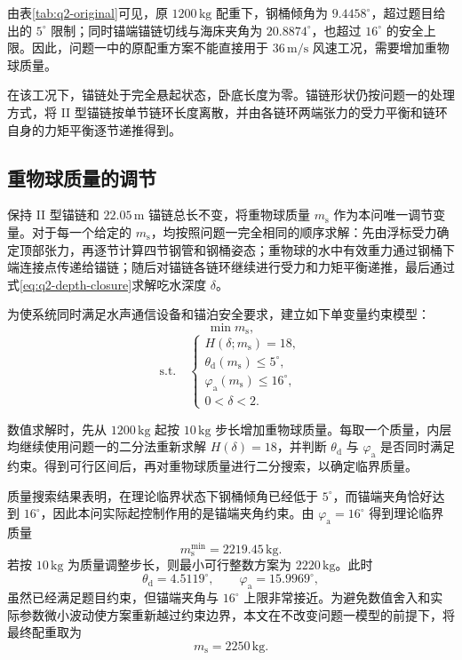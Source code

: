 由表\ref{tab:q2-original}可见，原 $1200\,\mathrm{kg}$ 配重下，钢桶倾角为 $9.4458^{\circ}$，超过题目给出的 $5^{\circ}$ 限制；同时锚端锚链切线与海床夹角为 $20.8874^{\circ}$，也超过 $16^{\circ}$ 的安全上限。因此，问题一中的原配重方案不能直接用于 $36\,\mathrm{m/s}$ 风速工况，需要增加重物球质量。

在该工况下，锚链处于完全悬起状态，卧底长度为零。锚链形状仍按问题一的处理方式，将 II 型锚链按单节链环长度离散，并由各链环两端张力的受力平衡和链环自身的力矩平衡逐节递推得到。

\subsection{重物球质量的调节}

保持 II 型锚链和 $22.05\,\mathrm{m}$ 锚链总长不变，将重物球质量 $m_{\mathrm s}$ 作为本问唯一调节变量。对于每一个给定的 $m_{\mathrm s}$，均按照问题一完全相同的顺序求解：先由浮标受力确定顶部张力，再逐节计算四节钢管和钢桶姿态；重物球的水中有效重力通过钢桶下端连接点传递给锚链；随后对锚链各链环继续进行受力和力矩平衡递推，最后通过式\eqref{eq:q2-depth-closure}求解吃水深度 $\delta$。

为使系统同时满足水声通信设备和锚泊安全要求，建立如下单变量约束模型：
\begin{equation}
  \min m_{\mathrm s},
  \label{eq:q2-objective}
\end{equation}
\begin{equation}
  \text{s.t.}\quad
  \begin{cases}
    H(\delta;m_{\mathrm s})=18,\\
    \theta_{\mathrm d}(m_{\mathrm s})\leq 5^{\circ},\\
    \varphi_{\mathrm a}(m_{\mathrm s})\leq 16^{\circ},\\
    0<\delta<2.
  \end{cases}
  \label{eq:q2-constraints}
\end{equation}

数值求解时，先从 $1200\,\mathrm{kg}$ 起按 $10\,\mathrm{kg}$ 步长增加重物球质量。每取一个质量，内层均继续使用问题一的二分法重新求解 $H(\delta)=18$，并判断 $\theta_{\mathrm d}$ 与 $\varphi_{\mathrm a}$ 是否同时满足约束。得到可行区间后，再对重物球质量进行二分搜索，以确定临界质量。

质量搜索结果表明，在理论临界状态下钢桶倾角已经低于 $5^{\circ}$，而锚端夹角恰好达到 $16^{\circ}$，因此本问实际起控制作用的是锚端夹角约束。由 $\varphi_{\mathrm a}=16^{\circ}$ 得到理论临界质量
\begin{equation}
  m_{\mathrm s}^{\min}=2219.45\,\mathrm{kg}.
  \label{eq:q2-critical-mass}
\end{equation}
若按 $10\,\mathrm{kg}$ 为质量调整步长，则最小可行整数方案为 $2220\,\mathrm{kg}$。此时
\[
  \theta_{\mathrm d}=4.5119^{\circ},\qquad
  \varphi_{\mathrm a}=15.9969^{\circ},
\]
虽然已经满足题目约束，但锚端夹角与 $16^{\circ}$ 上限非常接近。为避免数值舍入和实际参数微小波动使方案重新越过约束边界，本文在不改变问题一模型的前提下，将最终配重取为
\begin{equation}
  \boxed{m_{\mathrm s}=2250\,\mathrm{kg}}.
  \label{eq:q2-selected-mass}
\end{equation}

